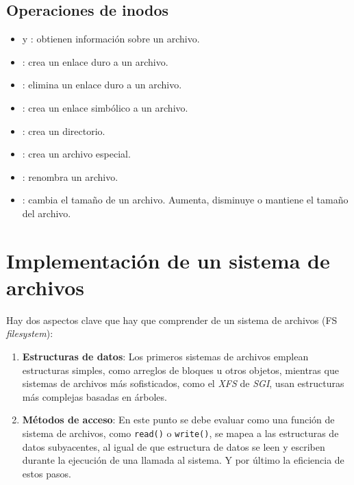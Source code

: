 \documentclass[openany]{book}
\begin{document}
\subsection{Operaciones de inodos}

\begin{itemize}
    \item {} y : obtienen información sobre un archivo.
    \item {}: crea un enlace duro a un archivo.
    \item {}: elimina un enlace duro a un archivo.
    \item {}: crea un enlace simbólico a un archivo.
    \item {}: crea un directorio.
    \item {}: crea un archivo especial.
    \item {}: renombra un archivo.
    \item {}: cambia el tamaño de un archivo. Aumenta, disminuye o mantiene el tamaño del archivo.  
\end{itemize}

\newpage

\section{Implementación de un sistema de archivos}

Hay dos aspectos clave que hay que comprender de un sistema de archivos (FS \textit{filesystem}):

\begin{enumerate}
    \item \textbf{Estructuras de datos}: Los primeros sistemas de archivos emplean estructuras simples, como \colorbox{green!20}{arreglos} de bloques u otros objetos, mientras que sistemas de archivos más sofisticados, como el \textit{XFS} de \textit{SGI}, usan estructuras más complejas basadas en \colorbox{green!20}{árboles}.
    \item \textbf{Métodos de acceso}: En este punto se debe evaluar como una función de sistema de archivos, como \texttt{read()} o \texttt{write()}, se \colorbox{green!20}{mapea} a las estructuras de datos subyacentes, al igual de que estructura de datos se leen y escriben durante la ejecución de una llamada al sistema. Y por último la \colorbox{green!20}{eficiencia} de estos pasos.
\end{enumerate}
\end{document}
